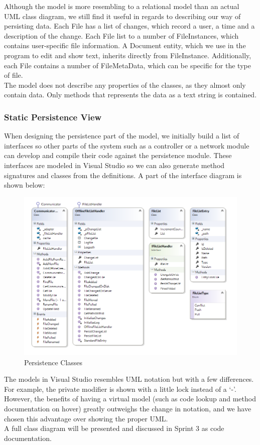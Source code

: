 Although the model is more resembling to a relational model than an actual UML class diagram, we still find it useful in regards to describing our way of persisting data. Each File has a list of changes, which record a user, a time and a description of the change. Each File list to a number of FileInstances, which contains user-specific file information. A Document entity, which we use in the program to edit and show text, inherits directly from FileInstance. Additionally, each File contains a number of FileMetaData, which can be specific for the type of file.\\
The model does not describe any properties of the classes, as they almost only contain data. Only methods that represents the data as a text string is contained.
\subsubsection{Static Persistence View}
When designing the persistence part of the model, we initially build a list of interfaces so other parts of the system such as a controller or a network module can develop and compile their code against the persistence module. These interfaces are modeled in Visual Studio so we can also generate method signatures and classes from the definitions. A part of the interface diagram is shown below:\\
\begin{figure}[H]
  \includegraphics[width=\textwidth]{illustrations/persistenceclasses.png}
  \caption{Persistence Classes}
  \label{persistenceclasses}
\end{figure}
The models in Visual Studio resembles UML notation but with a few differences. For example, the private modifier is shown with a little lock instead of a ‘-'. However, the benefits of having a virtual model (such as code lookup and method documentation on hover) greatly outweighs the change in notation, and we have chosen this advantage over showing the proper UML.\\
A full class diagram will be presented and discussed in Sprint 3 as code documentation.
